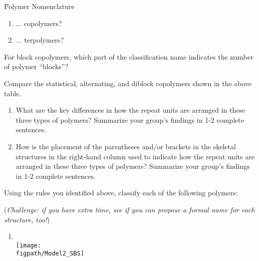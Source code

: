 \begin{activity}{Polymer Nomenclature}
\begin{ctqs}
\begin{enumerate}
			\item ... copolymers?
			
				\begin{solution}[0.25in]
				\end{solution}
			
			\item ... terpolymers?
			
				\begin{solution}[0.25in]
				\end{solution}
			
		\end{enumerate}
	
	\question For block copolymers, which part of the classification name indicates the number of polymer ``blocks''?
			
				\begin{solution}[0.5in]
				\end{solution}

	\question Compare the statistical, alternating, and diblock copolymers shown in the above table.
	
		\begin{enumerate}
		
			\item What are the key differences in how the repeat units are arranged in these three types of polymers?  Summarize your group's findings in 1-2 complete sentences.
			
				\begin{solution}[1.75in]
				\end{solution}
	
			\item How is the placement of the parentheses and/or brackets in the skeletal structures in the right-hand column used to indicate how the repeat units are arranged in these three types of polymers?  Summarize your group's findings in 1-2 complete sentences.
			
				\begin{solution}[1.75in]
				\end{solution}
			
		\end{enumerate}
		
	\question Using the rules you identified above, classify each of the following polymers: 
	
		(\emph{Challenge: if you have extra time, see if you can propose a formal name for each structure, too!})
	
		\begin{enumerate}
			\item \text{}\\\texttt{[image: \\figpath/Model2\_SBS]}
			

\end{enumerate}
\end{ctqs}
\end{activity}
